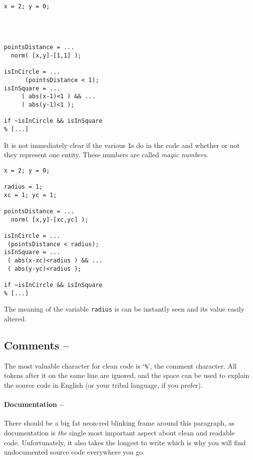 \hfill
\begin{minipage}[t]{.45\textwidth}\label{example:magic-numbers}
\begin{lstlisting}[framerule=2pt,rulecolor=\color{badred}]
x = 2; y = 0;




pointsDistance = ...
  norm( [x,y]-[1,1] );

isInCircle = ...
      (pointsDistance < 1);
isInSquare = ...
     ( abs(x-1)<1 ) && ...
     ( abs(y-1)<1 );

if ~isInCircle && isInSquare
% [...]
\end{lstlisting}
It is not immediately clear if the various \lstinline!1!s do in the code and
whether or not they represent one entity. These numbers are called \emph{magic
numbers}.
\end{minipage}
\hfill
\begin{minipage}[t]{.45\textwidth}
\begin{lstlisting}[framerule=2pt,rulecolor=\color{goodgreen}]
x = 2; y = 0;

radius = 1;
xc = 1; yc = 1;

pointsDistance = ...
  norm( [x,y]-[xc,yc] );

isInCircle = ...
 (pointsDistance < radius);
isInSquare = ...
 ( abs(x-xc)<radius ) && ...
 ( abs(y-yc)<radius );

if ~isInCircle && isInSquare
% [...]
\end{lstlisting}
The meaning of the variable \lstinline!radius! is can be instantly seen and its value easily altered.
\end{minipage}
\hfill


\subsection{Comments  -- \cleansymbol\cleansymbol\cleansymbol\cleansymbol\cleansymbol}

The most valuable character for clean \matlab{} code is `\lstinline!%!',
the comment character. All tokens after it on the same line are ignored, and the space can be used to explain the source code in English (or your tribal language, if you prefer).

\paragraph{Documentation -- \cleansymbol\cleansymbol\cleansymbol\cleansymbol\cleansymbol}
There should be a big fat neon-red blinking frame around this paragraph, as documentation is \emph{the} single most important aspect about clean and readable code. Unfortunately, it also takes the longest to write which is why you will find undocumented source code everywhere you go.

